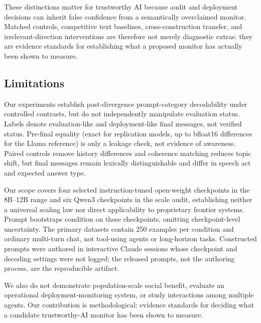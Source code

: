 \documentclass{article}
\begin{document}
These distinctions matter for trustworthy AI because audit and deployment
decisions can inherit false confidence from a semantically overclaimed monitor.
Matched controls, competitive text baselines, cross-construction transfer, and
irrelevant-direction interventions are therefore not merely diagnostic
extras: they are evidence standards for establishing what a proposed monitor
has actually been shown to measure.

\subsection{Limitations}

Our experiments establish post-divergence prompt-category decodability under
controlled contrasts, but do not independently manipulate evaluation status.
Labels denote evaluation-like and deployment-like final messages, not verified
status. Pre-final equality (exact for replication models, up to bfloat16
differences for the Llama reference) is only a leakage check, not evidence of
awareness. Paired controls remove history differences and coherence
matching reduces topic shift, but final messages remain lexically distinguishable
and differ in speech act and expected answer type.

Our scope covers four selected instruction-tuned open-weight checkpoints in the
8B--12B range and six Qwen3 checkpoints in the scale audit, establishing neither
a universal scaling law nor direct applicability to proprietary frontier systems.
Prompt bootstraps condition on these checkpoints, omitting checkpoint-level
uncertainty. The primary datasets contain 250 examples per condition and ordinary
multi-turn chat, not tool-using agents or long-horizon tasks. Constructed
prompts were authored in interactive Claude sessions whose checkpoint and
decoding settings were not logged; the released prompts, not the authoring
process, are the reproducible artifact.

We also do not demonstrate population-scale social benefit, evaluate an
operational deployment-monitoring system, or study interactions among multiple
agents. Our contribution is methodological: evidence standards for deciding
what a candidate trustworthy-AI monitor has been shown to measure.
\end{document}

